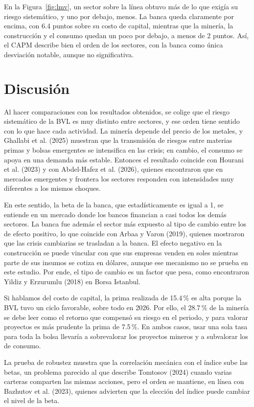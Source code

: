\documentclass[12pt]{article}
\begin{document}
En la Figura~\ref{fig:lmv}, un sector sobre la línea obtuvo más de lo que exigía su riesgo sistemático, y uno por debajo, menos. La banca queda claramente por encima, con 6.4 puntos sobre su costo de capital, mientras que la minería, la construcción y el consumo quedan un poco por debajo, a menos de 2 puntos. Así, el CAPM describe bien el orden de los sectores, con la banca como única desviación notable, aunque no significativa.

\section{Discusión}
Al hacer comparaciones con los resultados obtenidos, se colige que el riesgo sistemático de la BVL es muy distinto entre sectores, y ese orden tiene sentido con lo que hace cada actividad. La minería depende del precio de los metales, y Ghallabi et al. (2025) muestran que la transmisión de riesgos entre materias primas y bolsas emergentes se intensifica en las crisis; en cambio, el consumo se apoya en una demanda más estable. Entonces el resultado coincide con Hourani et al. (2023) y con Abdel-Hafez et al. (2026), quienes encontraron que en mercados emergentes y frontera los sectores responden con intensidades muy diferentes a los mismos choques.

En este sentido, la beta de la banca, que estadísticamente es igual a 1, se entiende en un mercado donde los bancos financian a casi todos los demás sectores. La banca fue además el sector más expuesto al tipo de cambio entre los de efecto positivo, lo que coincide con Arbaa y Varon (2019), quienes mostraron que las crisis cambiarias se trasladan a la banca. El efecto negativo en la construcción se puede vincular con que sus empresas venden en soles mientras parte de sus insumos se cotiza en dólares, aunque ese mecanismo no se prueba en este estudio. Por ende, el tipo de cambio es un factor que pesa, como encontraron Yildiz y Erzurumlu (2018) en Borsa Istanbul.

Si hablamos del costo de capital, la prima realizada de 15.4\,\% es alta porque la BVL tuvo un ciclo favorable, sobre todo en 2026. Por ello, el 28.7\,\% de la minería se debe leer como el retorno que compensó su riesgo en el periodo, y para valorar proyectos es más prudente la prima de 7.5\,\%. En ambos casos, usar una sola tasa para toda la bolsa llevaría a sobrevalorar los proyectos mineros y a subvalorar los de consumo.

La prueba de robustez muestra que la correlación mecánica con el índice sube las betas, un problema parecido al que describe Tomtosov (2024) cuando varias carteras comparten las mismas acciones, pero el orden se mantiene, en línea con Bazhutov et al. (2023), quienes advierten que la elección del índice puede cambiar el nivel de la beta.
\end{document}
